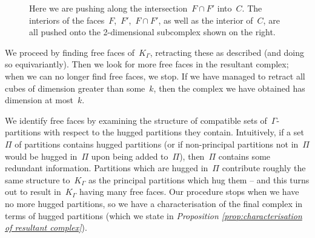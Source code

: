 \documentclass[11pt]{amsart}
\theoremstyle{definition}
\theoremstyle{definition}
\theoremstyle{definition}
\theoremstyle{definition}
\newcommand{\spine}{K_{\Gamma}} %
\begin{document}
\begin{figure}
\begin{center}
        \caption{Here we are pushing along the intersection~$F \cap F'$ into~$C$. The interiors of the faces~$F$,~$F'$,~$F \cap F'$, as well as the interior of~$C$, are all pushed onto the 2-dimensional subcomplex shown on the right.}
        \label{fig:pushin (intersection of 2 faces)}
    \end{center}
\end{figure}

We proceed by finding free faces of~$\spine$, retracting these as described (and doing so equivariantly). Then we look for more free faces in the resultant complex; when we can no longer find free faces, we stop. If we have managed to retract all cubes of dimension greater than some~$k$, then the complex we have obtained has dimension at most~$k$. 

We identify free faces by examining the structure of compatible sets of~$\Gamma$-partitions with respect to the hugged partitions they contain. Intuitively, if a set~$\Pi$ of partitions contains hugged partitions (or if non-principal partitions not in~$\Pi$ would be hugged in~$\Pi$ upon being added to~$\Pi$), then~$\Pi$ contains some redundant information. Partitions which are hugged in~$\Pi$ contribute roughly the same structure to~$\spine$ as the principal partitions which hug them -- and this turns out to result in~$\spine$ having many free faces. Our procedure stops when we have no more hugged partitions, so we have a characterisation of the final complex in terms of hugged partitions (which we state in \textit{Proposition \ref{prop:characterisation of resultant complex}}).
\end{document}
